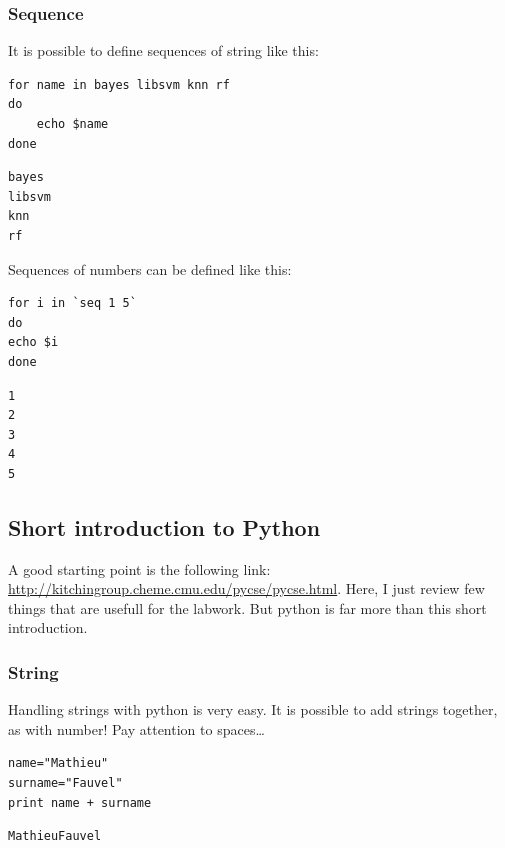 \documentclass[a4paper,11pt,DIV=18]{scrartcl}
\begin{document}
\subsubsection{Sequence}
\label{sec:orgc957394}
It is possible to define sequences of string like this:

\begin{verbatim}
for name in bayes libsvm knn rf
do
    echo $name
done
\end{verbatim}

\begin{verbatim}
bayes
libsvm
knn
rf
\end{verbatim}

Sequences of numbers can be defined like this:

\begin{verbatim}
for i in `seq 1 5`
do
echo $i
done
\end{verbatim}

\begin{verbatim}
1
2
3
4
5
\end{verbatim}
\subsection{Short introduction to Python}
\label{sec:org3832d70}
A     good    starting     point     is     the    following     link:
\url{http://kitchingroup.cheme.cmu.edu/pycse/pycse.html}.   Here,   I   just
review few things that are usefull  for the labwork. But python is far
more than this short introduction.
\subsubsection{String}
\label{sec:orga41f983}
Handling  strings with  python is  very easy.  It is  possible to  add
strings together, as with number! Pay attention to spaces\ldots{}

\begin{verbatim}
name="Mathieu"
surname="Fauvel"
print name + surname
\end{verbatim}

\begin{verbatim}
MathieuFauvel
\end{verbatim}
\end{document}
